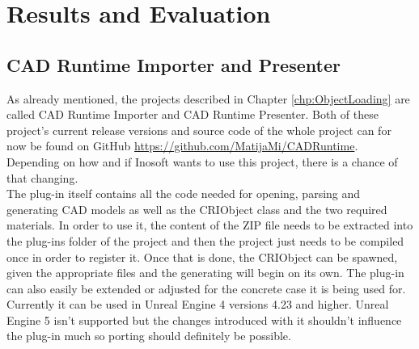 \chapter{Results and Evaluation}\label{chp:Results}

\section{CAD Runtime Importer and Presenter}

As already mentioned, the projects described in Chapter \ref{chp:ObjectLoading} are called CAD Runtime Importer and CAD Runtime Presenter. Both of these project's current release versions and source code of the whole project can for now be found on GitHub \url{https://github.com/MatijaMi/CADRuntime}. Depending on how and if Inosoft wants to use this project, there is a chance of that changing.\\
The plug-in itself contains all the code needed for opening, parsing and generating CAD models as well as the CRIObject class and the two required materials. In order to use it, the content of the ZIP file needs to be extracted into the plug-ins folder of the project and then the project just needs to be compiled once in order to register it. Once that is done, the CRIObject can be spawned, given the appropriate files and the generating will begin on its own. The plug-in can also easily be extended or adjusted for the concrete case it is being used for. Currently it can be used in Unreal Engine 4 versions 4.23 and higher. Unreal Engine 5 isn't supported but the changes introduced with it shouldn't influence the plug-in much so porting should definitely be possible.\\
